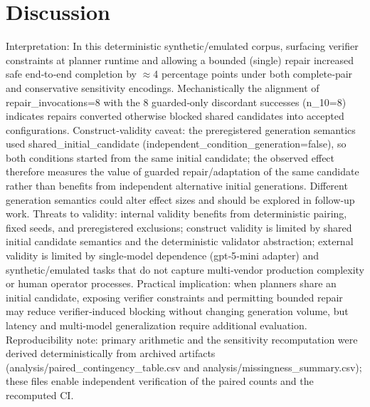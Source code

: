 \documentclass[conference]{IEEEtran}
\begin{document}
\section{Discussion}
Interpretation: In this deterministic synthetic/emulated corpus, surfacing verifier constraints at planner runtime and allowing a bounded (single) repair increased safe end‑to‑end completion by \ensuremath{\approx}4 percentage points under both complete‑pair and conservative sensitivity encodings. Mechanistically the alignment of repair\_invocations=8 with the 8 guarded‑only discordant successes (n\_10=8) indicates repairs converted otherwise blocked shared candidates into accepted configurations. Construct‑validity caveat: the preregistered generation semantics used shared\_initial\_candidate (independent\_condition\_generation=false), so both conditions started from the same initial candidate; the observed effect therefore measures the value of guarded repair/adaptation of the same candidate rather than benefits from independent alternative initial generations. Different generation semantics could alter effect sizes and should be explored in follow‑up work. Threats to validity: internal validity benefits from deterministic pairing, fixed seeds, and preregistered exclusions; construct validity is limited by shared initial candidate semantics and the deterministic validator abstraction; external validity is limited by single‑model dependence (gpt‑5‑mini adapter) and synthetic/emulated tasks that do not capture multi‑vendor production complexity or human operator processes. Practical implication: when planners share an initial candidate, exposing verifier constraints and permitting bounded repair may reduce verifier‑induced blocking without changing generation volume, but latency and multi‑model generalization require additional evaluation. Reproducibility note: primary arithmetic and the sensitivity recomputation were derived deterministically from archived artifacts (analysis/paired\_contingency\_table.csv and analysis/missingness\_summary.csv); these files enable independent verification of the paired counts and the recomputed CI.
\end{document}
